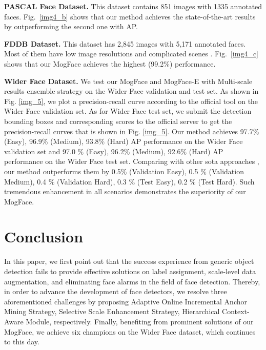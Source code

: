 \documentclass[10pt,twocolumn,letterpaper]{article}
\begin{document}
\noindent \textbf{PASCAL Face Dataset.} This dataset contains 851 images with 1335 annotated faces. Fig.~\ref{img4_b} shows that our method achieves the state-of-the-art results by outperforming the second one with  AP. 

\noindent \textbf{FDDB Dataset.} This dataset has 2,845 images with 5,171 annotated faces. Most of them have low image resolutions and complicated scenes
. Fig.~\ref{img4_c} shows that our MogFace achieves the highest (99.2\%) performance.


\noindent\textbf{Wider Face Dataset.} We test our MogFace and MogFace-E with Multi-scale results ensemble strategy on the Wider Face validation and test set. As shown in Fig. \ref{img_5}, we plot a precision-recall curve according to the official tool on the Wider Face validation set.  As for Wider Face test set, we submit the detection bounding boxes and corresponding scores to the official server to get the precision-recall curves that is shown in Fig. \ref{img_5}. Our method achieves 97.7\% (Easy), 96.9\% (Medium), 93.8\% (Hard) AP performance on the Wider Face validation set and 97.0 \% (Easy), 96.2\% (Medium), 92.6\% (Hard) AP performance on the Wider Face test set. Comparing with other sota approaches  \cite{hu2017finding,wang2017detecting,li2019dsfd, wang2017face, chi2019selective,zhang2018face, zhu2018seeing, cai2016unified,zhu2017cms,zhang2020asfd}, our method outperforms them by  0.5\% (Validation Easy), 0.5 \% (Validation Medium), 0.4 \% (Validation Hard), 0.3 \% (Test Easy), 0.2 \% (Test Hard). Such tremendous enhancement in all scenarios demonstrates the superiority of our MogFace.

\section{Conclusion}
In this paper,  we first point out that the success experience from generic object detection fails to provide effective solutions on  label assignment, scale-level data augmentation, and eliminating face alarms in the field of face detection. 
Thereby, in order to advance the development of face detectors, we resolve three aforementioned challenges by proposing Adaptive Online Incremental Anchor Mining Strategy, Selective Scale Enhancement Strategy, Hierarchical Context-Aware Module, respectively. Finally, benefiting from prominent solutions of our MogFace,  we achieve six champions on the Wider Face dataset, which continues to this day. 

\newpage

{\small


}
\end{document}

